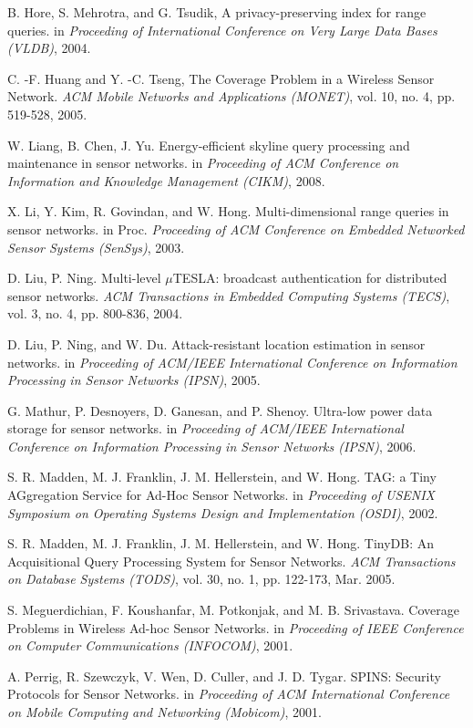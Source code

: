 \documentclass[conference]{IEEEtran}
\begin{document}
\begin{thebibliography}{1}
B. Hore, S. Mehrotra, and G. Tsudik, A privacy-preserving index for range queries. in \emph{Proceeding of International Conference on Very Large Data Bases (VLDB)}, 2004.

C. -F. Huang and Y. -C. Tseng, The Coverage Problem in a Wireless Sensor Network. \emph{ACM Mobile Networks and Applications (MONET)}, vol. 10, no. 4, pp. 519-528, 2005.

W. Liang, B. Chen, J. Yu. Energy-efficient skyline query processing and maintenance in sensor networks. in \emph{Proceeding of ACM Conference on Information and Knowledge Management (CIKM)}, 2008.

X. Li, Y. Kim, R. Govindan, and W. Hong. Multi-dimensional range queries in sensor networks. in Proc. \emph{Proceeding of ACM Conference on Embedded Networked Sensor Systems (SenSys)}, 2003.

D. Liu, P. Ning. Multi-level $\mu$TESLA: broadcast authentication for distributed sensor networks. \emph{ACM Transactions in Embedded Computing Systems (TECS)}, vol. 3, no. 4, pp. 800-836, 2004.

D. Liu, P. Ning, and W. Du. Attack-resistant location estimation in sensor networks. in \emph{Proceeding of ACM/IEEE International Conference on Information Processing in Sensor Networks (IPSN)}, 2005.

G. Mathur, P. Desnoyers, D. Ganesan, and P. Shenoy. Ultra-low power data storage for sensor networks. in \emph{Proceeding of ACM/IEEE International Conference on Information Processing in Sensor Networks (IPSN)}, 2006.

S. R. Madden, M. J. Franklin, J. M. Hellerstein, and W. Hong. TAG: a Tiny AGgregation Service for Ad-Hoc Sensor Networks. in \emph{Proceeding of USENIX Symposium on Operating Systems Design and Implementation (OSDI)}, 2002.

S. R. Madden, M. J. Franklin, J. M. Hellerstein, and W. Hong. TinyDB: An Acquisitional Query Processing System for Sensor Networks. \emph{ACM Transactions on Database Systems (TODS)}, vol. 30, no. 1, pp. 122-173, Mar. 2005.

S. Meguerdichian, F. Koushanfar, M. Potkonjak, and M. B. Srivastava. Coverage Problems in Wireless Ad-hoc Sensor Networks. in \emph{Proceeding of IEEE Conference on Computer Communications (INFOCOM)}, 2001.

A. Perrig, R. Szewczyk, V. Wen, D. Culler, and J. D. Tygar. SPINS: Security Protocols for Sensor Networks. in \emph{Proceeding of ACM International Conference on Mobile Computing and Networking (Mobicom)}, 2001.


\end{thebibliography}
\end{document}
